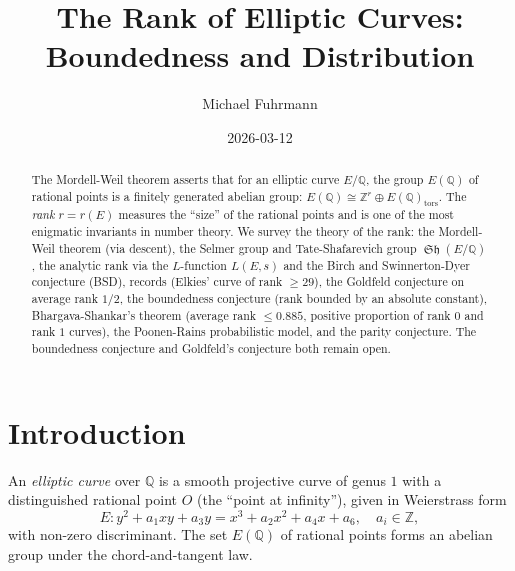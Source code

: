 \documentclass[12pt,a4paper]{amsart}
\theoremstyle{definition}
\theoremstyle{remark}
\newcommand{\Z}{\mathbb{Z}}
\newcommand{\Q}{\mathbb{Q}}
\DeclareMathOperator{\Sha}{\mathfrak{Sh}}
\begin{document}

\title{The Rank of Elliptic Curves:\\
  Boundedness and Distribution}

\author{Michael Fuhrmann}
\address{Specialist Mathematics Project, Build 167}
\date{2026-03-12}

\begin{abstract}
The Mordell-Weil theorem asserts that for an elliptic curve $E/\Q$, the group $E(\Q)$
of rational points is a finitely generated abelian group:
$E(\Q) \cong \Z^r \oplus E(\Q)_{\mathrm{tors}}$.
The \emph{rank} $r = r(E)$ measures the ``size'' of the rational points and is one of
the most enigmatic invariants in number theory.
We survey the theory of the rank: the Mordell-Weil theorem (via descent), the Selmer
group and Tate-Shafarevich group $\Sha(E/\Q)$, the analytic rank via the
$L$-function $L(E,s)$ and the Birch and Swinnerton-Dyer conjecture (BSD),
records (Elkies' curve of rank $\geq 29$), the Goldfeld conjecture on average rank $1/2$,
the boundedness conjecture (rank bounded by an absolute constant),
Bhargava-Shankar's theorem (average rank $\leq 0.885$, positive proportion of rank $0$
and rank $1$ curves), the Poonen-Rains probabilistic model, and the parity conjecture.
The boundedness conjecture and Goldfeld's conjecture both remain open.
\end{abstract}

\maketitle

\tableofcontents

\section{Introduction}

An \emph{elliptic curve} over $\Q$ is a smooth projective curve of genus $1$ with a
distinguished rational point $O$ (the ``point at infinity''), given in Weierstrass form
\[
  E\colon y^2 + a_1 xy + a_3 y = x^3 + a_2 x^2 + a_4 x + a_6, \quad a_i \in \Z,
\]
with non-zero discriminant. The set $E(\Q)$ of rational points forms an abelian group
under the chord-and-tangent law.
\end{document}
